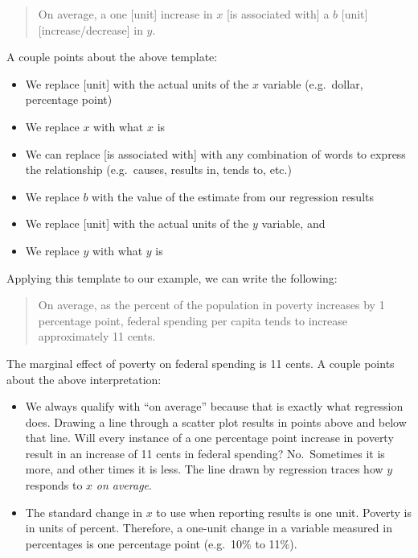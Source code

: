 \documentclass[
]{book}
\providecommand{\tightlist}{%
  \setlength{\itemsep}{0pt}\setlength{\parskip}{0pt}}
\begin{document}
\begin{quote}
On average, a one {[}unit{]} increase in \(x\) {[}is associated with{]} a \(b\) {[}unit{]} {[}increase/decrease{]} in \(y\).
\end{quote}

A couple points about the above template:

\begin{itemize}
\tightlist
\item
  We replace {[}unit{]} with the actual units of the \(x\) variable (e.g.~dollar, percentage point)
\item
  We replace \(x\) with what \(x\) is
\item
  We can replace {[}is associated with{]} with any combination of words to express the relationship (e.g.~causes, results in, tends to, etc.)
\item
  We replace \(b\) with the value of the estimate from our regression results
\item
  We replace {[}unit{]} with the actual units of the \(y\) variable, and
\item
  We replace \(y\) with what \(y\) is
\end{itemize}

Applying this template to our example, we can write the following:

\begin{quote}
On average, as the percent of the population in poverty increases by 1 percentage point, federal spending per capita tends to increase approximately 11 cents.
\end{quote}

The marginal effect of poverty on federal spending is 11 cents. A couple points about the above interpretation:

\begin{itemize}
\tightlist
\item
  We always qualify with ``on average'' because that is exactly what regression does. Drawing a line through a scatter plot results in points above and below that line. Will every instance of a one percentage point increase in poverty result in an increase of 11 cents in federal spending? No.~Sometimes it is more, and other times it is less. The line drawn by regression traces how \(y\) responds to \(x\) \emph{on average}.
\item
  The standard change in \(x\) to use when reporting results is one unit. Poverty is in units of percent. Therefore, a one-unit change in a variable measured in percentages is one percentage point (e.g.~10\% to 11\%).
\end{itemize}
\end{document}

